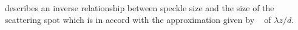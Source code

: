  describes an inverse relationship between speckle
size and the size of the scattering spot which is in accord with the
approximation given by ~\cite{dainty1975laser} of $\lambda z/d$.  


